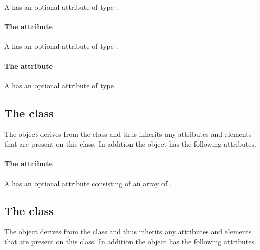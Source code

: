 A \Text has an optional attribute  of type
\HTextAnchor.

\paragraph{The \fixttspace{} attribute}

A \Text has an optional attribute  of type
\VTextAnchor.

\paragraph{The \fixttspace{} attribute}

A \Text has an optional attribute  of type
\RelAbsVector.

\subsection{The  class}
\label{transformationtwod-class}


The \TransformationTwoD object derives from the 
class and thus inherits any attributes and elements that are present on
this class.
In addition the \TransformationTwoD object has the following attributes.

\paragraph{The \fixttspace{} attribute}

A \TransformationTwoD has an optional attribute 
consisting of an array of .

\subsection{The  class}
\label{transformation-class}


The \Transformation object derives from the  class and thus
inherits any attributes and elements that are present on this class.
In addition the \Transformation object has the following attributes.

